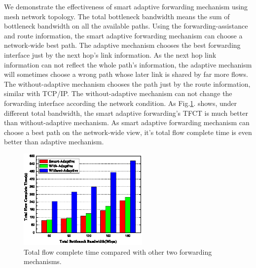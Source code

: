 We demonstrate the effectiveness of smart adaptive forwarding mechanism using mesh network topology. The total bottleneck bandwidth means the sum of bottleneck bandwidth on all the available paths. Using the forwarding-assistance and route information, the smart adaptive forwarding mechanism can choose a network-wide best path. The adaptive mechanism chooses the best forwarding interface just by the next hop's link information. As the next hop link information can not reflect the whole path's information, the adaptive mechanism will sometimes choose a wrong path whose later link is shared by far more flows. The without-adaptive mechanism chooses the path just by the route information, similar with TCP/IP.  The without-adaptive mechanism can not change the forwarding interface according the network condition. As Fig.\ref{fig-tfct}. shows, under different total bandwidth, the smart adaptive forwarding's TFCT is much better than without-adaptive mechanism. As smart adaptive forwarding mechanism can choose a best path on the network-wide view, it's total flow complete time is even better than adaptive mechanism.
\begin{figure}[t]
\centering
\includegraphics[width=2.5in]{adaptive-pic-cut.eps}
\centering
\caption{Total flow complete time compared with other two forwarding mechanisms.}
\label{fig-tfct}
\end{figure}

